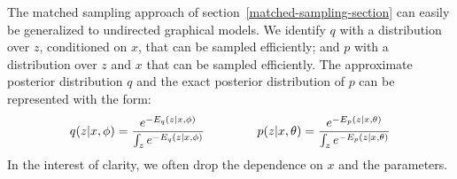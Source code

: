 \documentclass{article} %
\begin{document}




The matched sampling approach of section~\ref{matched-sampling-section} can easily be generalized to undirected graphical models.
We identify $q$ with a distribution over $z$, conditioned on $x$, that can be sampled efficiently; and $p$ with a distribution over $z$ and $x$ that can be sampled efficiently.  %
The approximate posterior distribution $q$ and the exact posterior distribution of $p$ can be represented with the form:
\begin{equation} \label{energy-model-equation}
q(z|x, \phi) = \frac{e^{-E_q(z|x, \phi)}}{\int_z e^{-E_q(z|x, \phi)}} \hspace{1.5cm}
p(z|x, \theta) = \frac{e^{-E_p(z|x, \theta)}}{\int_{z} e^{-E_p(z|x, \theta)}}  
\end{equation}
In the interest of clarity, we often drop the dependence on $x$ and the parameters.  

\end{document}
